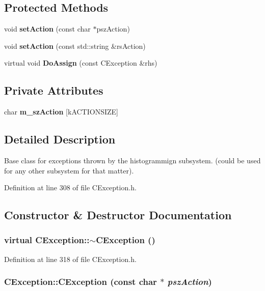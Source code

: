 \subsection*{Protected Methods}
\begin{CompactItemize}
\item 
void {\bf set\-Action} (const char $\ast$psz\-Action)
\item 
void {\bf set\-Action} (const std::string \&rs\-Action)
\item 
virtual void {\bf Do\-Assign} (const CException \&rhs)
\end{CompactItemize}
\subsection*{Private Attributes}
\begin{CompactItemize}
\item 
char {\bf m\_\-sz\-Action} [k\-ACTIONSIZE]
\end{CompactItemize}


\subsection{Detailed Description}
Base class for exceptions thrown  by the histogrammign subsystem. (could be used for any other subsystem for that matter). 



Definition at line 308 of file CException.h.

\subsection{Constructor \& Destructor Documentation}
\subsubsection{\setlength{\rightskip}{0pt plus 5cm}virtual CException::$\sim$CException ()\hspace{0.3cm}{\tt  [inline, virtual]}}\label{classCException_a0}




Definition at line 318 of file CException.h.
\subsubsection{\setlength{\rightskip}{0pt plus 5cm}CException::CException (const char $\ast$ {\em psz\-Action})}\label{classCException_a1}




